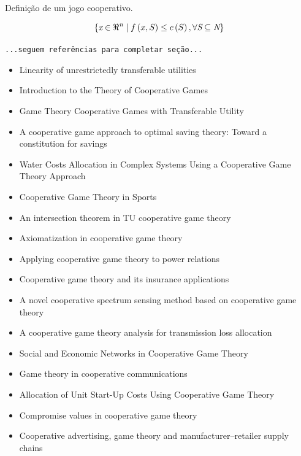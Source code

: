 \documentclass[
	article,			        %
	11pt,				          %
	oneside,			        %
	a4paper,			        %
	english,			        %
	brazil,				        %
	sumario=tradicional
]{abntex2}\usepackage[]{graphicx}\usepackage[]{color}
\begin{document}
Defini\c{c}\~ao de um jogo cooperativo.

\begin{equation}
  \label{eq:conceitoTJC}
  \left \{ 
    \emph{x} \in \Re^{\emph{n}} \mid f\left ( x,S \right ) \leq c\left ( S \right ), \forall \emph{S} \subseteq \emph{N}
  \right\}
\end{equation}

  \texttt{\color{red}...seguem refer\^encias para completar seção...}
  \begin{itemize}
    \item Linearity of unrestrictedly transferable utilities \cite{Aumann.1960}
    \item Introduction to the Theory of Cooperative Games \cite{Peleg.2007}
    \item Game Theory Cooperative Games with Transferable Utility \cite{Peters.2008}
    \item A cooperative game approach to optimal saving theory: Toward a constitution for savings \cite{Forte.1994}
    \item Water Costs Allocation in Complex Systems Using a Cooperative Game Theory Approach \cite{Sechi.2013}
    \item Cooperative Game Theory in Sports \cite{Manuel.2013}
    \item An intersection theorem in TU cooperative game theory \cite{Albeniz.2004}
    \item Axiomatization in cooperative game theory \cite{yakov.2005}
    \item Applying cooperative game theory to power relations \cite{Wiese.2009}
    \item Cooperative game theory and its insurance applications \cite{Lemaire.1993}
    \item A novel cooperative spectrum sensing method based on cooperative game theory \cite{KaitianCao.2010}
    \item A cooperative game theory analysis for transmission loss allocation \cite{Lima.2008}
    \item Social and Economic Networks in Cooperative Game Theory \cite{Ray.2002}
    \item Game theory in cooperative communications \cite{Yang.2012}
    \item Allocation of Unit Start-Up Costs Using Cooperative Game Theory \cite{Hu.2006}
    \item Compromise values in cooperative game theory \cite{Tijs.1993}
    \item Cooperative advertising, game theory and manufacturer--retailer supply chains \cite{Xie.2006}

\end{itemize}
\end{document}

